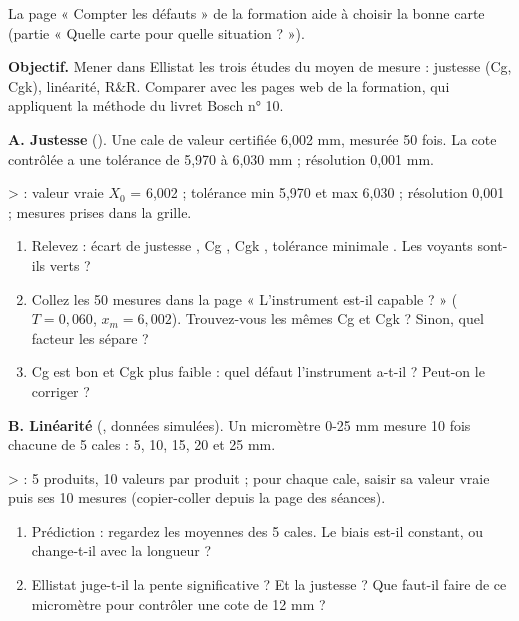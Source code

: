 \documentclass[10pt,a4paper]{article}
\begin{document}
{\small La page « Compter les défauts » de la formation aide à choisir la bonne carte (partie « Quelle carte pour quelle situation ? »).}

\newpage
\label{s4}

\textbf{Objectif.} Mener dans Ellistat les trois études du moyen de mesure : justesse (Cg, Cgk), linéarité, R\&R. Comparer avec les pages web de la formation, qui appliquent la méthode du livret Bosch n° 10.

\textbf{A. Justesse} (). Une cale de valeur certifiée 6,002 mm, mesurée 50 fois. La cote contrôlée a une tolérance de 5,970 à 6,030 mm ; résolution 0,001 mm.
\begin{tcolorbox}[pas]
 >  : valeur vraie $X_0$ = 6,002 ; tolérance min 5,970 et max 6,030 ; résolution 0,001 ; mesures prises dans la grille.
\end{tcolorbox}
\begin{enumerate}[label=\textcolor{cyan}{\textbf{Q\arabic*.}},leftmargin=22pt]
\item Relevez : écart de justesse \champ{18mm}, Cg \champ{14mm}, Cgk \champ{14mm}, tolérance minimale \champ{18mm}. Les voyants sont-ils verts ?\reponse
\item Collez les 50 mesures dans la page « L'instrument est-il capable ? » ($T = 0{,}060$, $x_m = 6{,}002$). Trouvez-vous les mêmes Cg et Cgk ? Sinon, quel facteur les sépare ?\reponse[2]
\item Cg est bon et Cgk plus faible : quel défaut l'instrument a-t-il ? Peut-on le corriger ?\reponse
\end{enumerate}

\textbf{B. Linéarité} (, données simulées). Un micromètre 0-25 mm mesure 10 fois chacune de 5 cales : 5, 10, 15, 20 et 25 mm.
\begin{tcolorbox}[pas]
 >  : 5 produits, 10 valeurs par produit ; pour chaque cale, saisir sa valeur vraie puis ses 10 mesures (copier-coller depuis la page des séances).
\end{tcolorbox}
\begin{enumerate}[label=\textcolor{cyan}{\textbf{Q\arabic*.}},leftmargin=22pt,resume]
\item Prédiction : regardez les moyennes des 5 cales. Le biais est-il constant, ou change-t-il avec la longueur ?\reponse
\item Ellistat juge-t-il la pente significative ? Et la justesse ? Que faut-il faire de ce micromètre pour contrôler une cote de 12 mm ?\reponse[2]
\end{enumerate}
\end{document}
